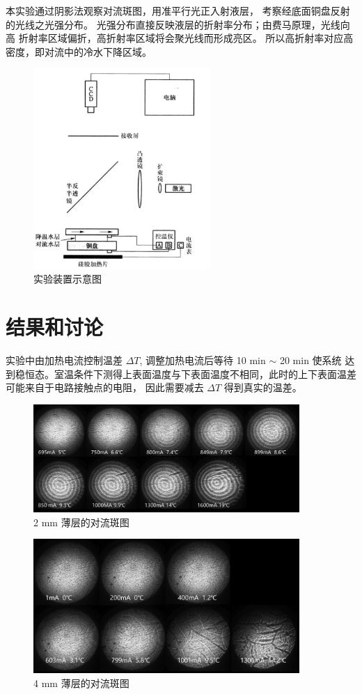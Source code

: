 \documentclass[revtex4-2]{mpltx}
\begin{document}
本实验通过阴影法观察对流斑图，用准平行光正入射液层，
考察经底面铜盘反射的光线之光强分布。
光强分布直接反映液层的折射率分布；由费马原理，光线向高
折射率区域偏折，高折射率区域将会聚光线而形成亮区。
所以高折射率对应高密度，即对流中的冷水下降区域。
\begin{figure}[htbp]
    \centering
    \includegraphics[width=0.6\textwidth]{1.png}
    \caption{实验装置示意图}
    \label{fig:1}
\end{figure}
\section{结果和讨论}
实验中由加热电流控制温差 $\Delta T$, 调整加热电流后等待 10 min $\sim$ 20 min 使系统
达到稳恒态。室温条件下测得上表面温度与下表面温度不相同，此时的上下表面温差可能来自于电路接触点的电阻，
因此需要减去 $\Delta T$ 得到真实的温差。

\begin{figure}[htbp]
    \centering
    \includegraphics[width=0.9\textwidth]{2.png}
    \caption{2 mm 薄层的对流斑图}
    \label{fig:2}
\end{figure}
\begin{figure}[htbp]
    \centering
    \includegraphics[width=0.9\textwidth]{3.png}
    \caption{4 mm 薄层的对流斑图}
    \label{fig:3}
\end{figure}
\end{document}
